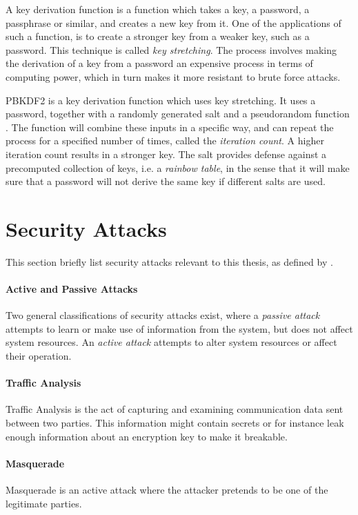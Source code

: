 \documentclass[pdftex,english,10pt,b5paper,twoside]{book}
\begin{document}
A key derivation function is a function which takes a key, a password, a
passphrase or similar, and creates a new key from it. One of the applications
of such a function, is to create a stronger key from a weaker key, such as a
password. This technique is called \emph{key stretching}. The process
involves making the derivation of a key from a password an expensive process
in terms of computing power, which in turn makes it more resistant to brute
force attacks.

\ac{PBKDF2} is a key derivation function which uses key stretching. It uses a
password, together with a randomly generated salt and a pseudorandom function
\cite{rfc2898}. The function will combine these inputs in a specific way, and
can repeat the process for a specified number of times, called the
\emph{iteration count}. A higher iteration count results in a stronger key. The
salt provides defense against a precomputed collection of keys, i.e. a
\emph{rainbow table}, in the sense that it will make sure that a password will
not derive the same key if different salts are used.

\section{Security Attacks}

This section briefly list security attacks relevant to this thesis, as defined
by \citet[Ch. 1.3]{stallings}.

\paragraph{Active and Passive Attacks} Two general classifications of security
attacks exist, where a \emph{passive attack} attempts to learn or make use of
information from the system, but does not affect system resources. An
\emph{active attack} attempts to alter system resources or affect their
operation.

\paragraph{Traffic Analysis} Traffic Analysis is the act of capturing and
examining communication data sent between two parties. This information might
contain secrets or for instance leak enough information about an encryption key
to make it breakable.

\paragraph{Masquerade} Masquerade is an active attack where the attacker pretends to be
one of the legitimate parties.
\end{document}
